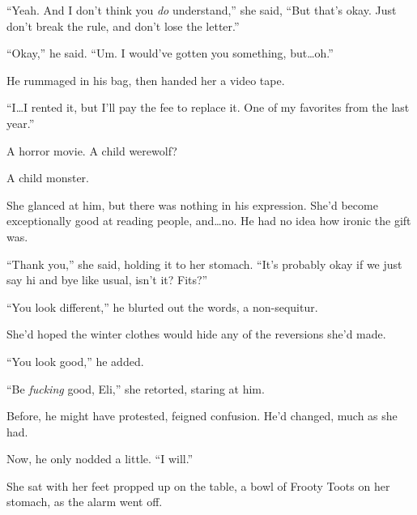 ``Yeah.  And I don't think you \emph{do }understand,'' she said, ``But that's okay.  Just don't break the rule, and don't lose the letter.''



``Okay,'' he said.  ``Um.  I would've gotten you something, but\ldots oh.''



He rummaged in his bag, then handed her a video tape.



``I\ldots I rented it, but I'll pay the fee to replace it.  One of my favorites from the last year.''



A horror movie.  A child werewolf?



A child monster.



She glanced at him, but there was nothing in his expression.  She'd become exceptionally good at reading people, and\ldots no.  He had no idea how ironic the gift was.



``Thank you,'' she said, holding it to her stomach.  ``It's probably okay if we just say hi and bye like usual, isn't it?  Fits?''



``You look different,'' he blurted out the words, a non-sequitur.



She'd hoped the winter clothes would hide any of the reversions she'd made.



``You look good,'' he added.



``Be \emph{fucking} good, Eli,'' she retorted, staring at him.



Before, he might have protested, feigned confusion.  He'd changed, much as she had.



Now, he only nodded a little.  ``I will.''



\sectionbreak






She sat with her feet propped up on the table, a bowl of Frooty Toots on her stomach, as the alarm went off.



